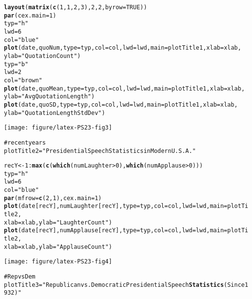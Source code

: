 \documentclass{article}\usepackage{graphicx, color}
\makeatletter
\newcommand{\hlfunctioncall}[1]{\textcolor[rgb]{0.501960784313725,0,0.329411764705882}{\textbf{#1}}}%
\newcommand{\hlstring}[1]{\textcolor[rgb]{0.6,0.6,1}{#1}}%
\newcommand{\hlcomment}[1]{\textcolor[rgb]{0.180392156862745,0.6,0.341176470588235}{#1}}%
\newenvironment{kframe}{%
 \def\at@end@of@kframe{}%
 \ifinner\ifhmode%
  \def\at@end@of@kframe{\end{minipage}}%
  \begin{minipage}{\columnwidth}%
 \fi\fi%
 \def\FrameCommand##1{\hskip\@totalleftmargin \hskip-\fboxsep
 \colorbox{shadecolor}{##1}\hskip-\fboxsep
     \hskip-\linewidth \hskip-\@totalleftmargin \hskip\columnwidth}%
 \MakeFramed {\advance\hsize-\width
   \@totalleftmargin\z@ \linewidth\hsize
   \@setminipage}}%
 {\par\unskip\endMakeFramed%
 \at@end@of@kframe}
\newenvironment{knitrout}{}{} %
\makeatother
\begin{document}
\begin{knitrout}
\begin{kframe}
\begin{alltt}
\hlfunctioncall{layout}(\hlfunctioncall{matrix}(\hlfunctioncall{c}(1, 1, 2, 3), 2, 2, byrow = TRUE))
\hlfunctioncall{par}(cex.main = 1)
typ = \hlstring{"h"}
lwd = 6
col = \hlstring{"blue"}
\hlfunctioncall{plot}(date, quoNum, type = typ, col = col, lwd = lwd, main = plotTitle1, xlab = xlab, 
    ylab = \hlstring{"Quotation Count"})
typ = \hlstring{"b"}
lwd = 2
col = \hlstring{"brown"}
\hlfunctioncall{plot}(date, quoMean, type = typ, col = col, lwd = lwd, main = plotTitle1, xlab = xlab, 
    ylab = \hlstring{"Avg Quotation Length"})
\hlfunctioncall{plot}(date, quoSD, type = typ, col = col, lwd = lwd, main = plotTitle1, xlab = xlab, 
    ylab = \hlstring{"Quotation Length Std Dev"})
\end{alltt}
\end{kframe}\texttt{[image: figure/latex-PS23-fig3]} \begin{kframe}\begin{alltt}
\hlcomment{# recent years}
plotTitle2 = \hlstring{"Presidential Speech Statistics in Modern U.S.A."}

recY <- 1:\hlfunctioncall{max}(\hlfunctioncall{c}(\hlfunctioncall{which}(numLaughter > 0), \hlfunctioncall{which}(numApplause > 0)))
typ = \hlstring{"h"}
lwd = 6
col = \hlstring{"blue"}
\hlfunctioncall{par}(mfrow = \hlfunctioncall{c}(2, 1), cex.main = 1)
\hlfunctioncall{plot}(date[recY], numLaughter[recY], type = typ, col = col, lwd = lwd, main = plotTitle2, 
    xlab = xlab, ylab = \hlstring{"Laughter Count"})
\hlfunctioncall{plot}(date[recY], numApplause[recY], type = typ, col = col, lwd = lwd, main = plotTitle2, 
    xlab = xlab, ylab = \hlstring{"Applause Count"})
\end{alltt}
\end{kframe}\texttt{[image: figure/latex-PS23-fig4]} \begin{kframe}\begin{alltt}
\hlcomment{# Rep vs Dem}
plotTitle3 = \hlstring{"Republican vs. Democratic Presidential Speech \hlfunctioncall{Statistics} (Since 1932)"}


\end{alltt}
\end{kframe}
\end{knitrout}
\end{document}
